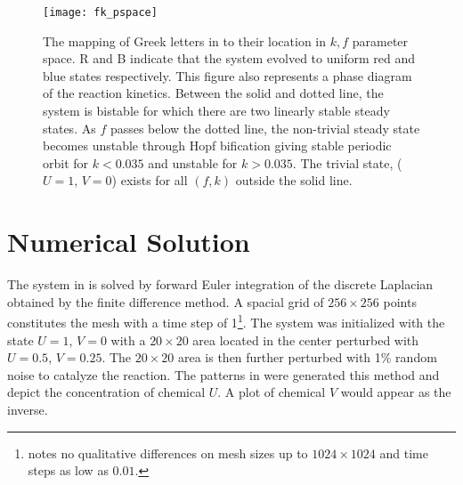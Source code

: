 \begin{figure}[h]
\begin{center}
\texttt{[image: fk\_pspace]}
\caption{\label{fig:fk_pspace} The mapping of Greek letters in  to their location in $k,f$ parameter space. R and B indicate that the system evolved to uniform red and blue states respectively. This figure also represents a phase diagram of the reaction kinetics. Between the solid and dotted line, the system is bistable for which there are two linearly stable steady states. As $f$ passes below the dotted line, the non-trivial steady state becomes unstable through Hopf bification giving stable periodic orbit for $k < 0.035$ and unstable for $k > 0.035$. The trivial state, ($U =1$, $V = 0$) exists for all $(f,k)$ outside the solid line.}
\end{center}
\end{figure}

\section{Numerical Solution}

The system in  is solved by forward Euler integration of the discrete Laplacian obtained by the finite difference method. A spacial grid of $256 \times 256$ points constitutes the mesh with a time step of 1\footnote{ notes no qualitative differences on mesh sizes up to $1024 \times 1024$ and time steps as low as $0.01$.}. The system was initialized with the state $U=1$, $V=0$ with a $20 \times 20$ area located in the center perturbed with $U=0.5$, $V=0.25$. The $20 \times 20$ area is then further perturbed with 1\% random noise to catalyze the reaction. The patterns in  were generated this method and depict the concentration of chemical $U$. A plot of chemical $V$ would appear as the inverse.












